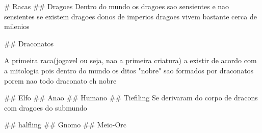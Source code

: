 # Racas
## Dragoes 
Dentro do mundo os dragoes sao sensientes e nao sensientes se existem dragoes donos de imperios 
dragoes vivem bastante cerca de milenios 



## Draconatos

A primeira raca(jogavel ou seja, nao a primeira criatura) a existir de acordo com a mitologia pois dentro do mundo os ditos "nobre" sao formados por draconatos porem nao todo draconato eh nobre 

## Elfo 
## Anao 
## Humano
## Tiefiling
Se derivaram do corpo de dracons com dragoes do submundo 

## halfling
## Gnomo
## Meio-Orc

